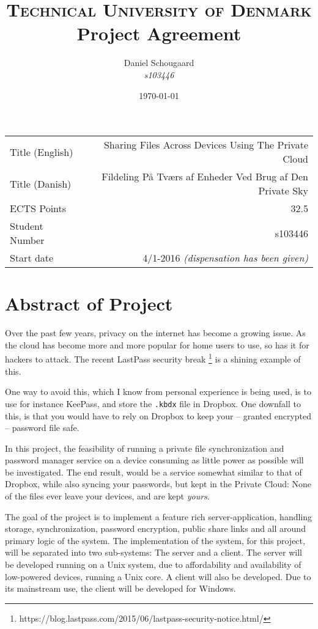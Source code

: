 \documentclass[a4paper,10pt]{article}
\title{	
\textsc{Technical University of Denmark} \\ [25pt] 
\huge Project Agreement
}
\author{Daniel Schougaard \\ \textit{s103446}}
\date{\normalsize\today}
\begin{document}
\maketitle 


\begin{tabular}{ | l | r | }
	Title (English)		&	Sharing Files Across Devices Using The Private Cloud				\\
	Title (Danish)		&	Fildeling På Tværs af Enheder Ved Brug af Den Private Sky			\\
	ECTS Points			&	32.5																\\
	Student Number		&	s103446																\\
	Start date 			&	4/1-2016 \textit{(dispensation has been given)}					\\
\end{tabular}



\section{Abstract of Project}
	Over the past few years, privacy on the internet has become a growing issue. As the cloud has become more and more popular for home users to use, so has it for hackers to attack. The recent LastPass security break \footnote{https://blog.lastpass.com/2015/06/lastpass-security-notice.html/} is a shining example of this.

	One way to avoid this, which I know from personal experience is being used, is to use for instance KeePass, and store the \verb=.kbdx= file in Dropbox. One downfall to this, is that you would have to rely on Dropbox to keep your -- granted encrypted -- password file safe.

	In this project, the feasibility of running a private file synchronization and password manager service on a device consuming as little power as possible will be investigated. The end result, would be a service somewhat similar to that of Dropbox, while also syncing your passwords, but kept in the Private Cloud: None of the files ever leave your devices, and are kept \emph{yours}.

	The goal of the project is to implement a feature rich server-application, handling storage, synchronization, password encryption, public share links and all around primary logic of the system. The implementation of the system, for this project, will be separated into two sub-systems: The server and a client. The server will be developed running on a Unix system, due to affordability and availability of low-powered devices, running a Unix core. A client will also be developed. Due to its mainstream use, the client will be developed for Windows.
\end{document}
